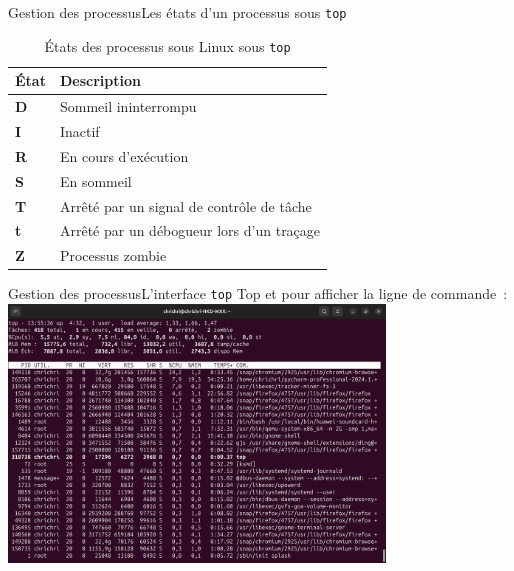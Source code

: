 \documentclass{beamer}
\begin{document}
    \begin{frame}{Gestion des processus}{Les états d'un processus sous \lstinline{top}}
        \begin{table}[h!]
            \centering
            \begin{tabular}{|p{}|p{}|}
                \hline
                \textbf{État} & \textbf{Description}                      \\ \hline
                \textbf{D}    & Sommeil ininterrompu                      \\ \hline
                \textbf{I}    & Inactif                                   \\ \hline
                \textbf{R}    & En cours d'exécution                      \\ \hline
                \textbf{S}    & En sommeil                                \\ \hline
                \textbf{T}    & Arrêté par un signal de contrôle de tâche \\ \hline
                \textbf{t}    & Arrêté par un débogueur lors d'un traçage \\ \hline
                \textbf{Z}    & Processus zombie                          \\ \hline
            \end{tabular}
            \caption{États des processus sous Linux sous \lstinline{top}}
        \end{table}
    \end{frame}

    \begin{frame}{Gestion des processus}{L'interface \lstinline{top}}
        Top et  pour afficher la ligne de commande~:
        \bigbreak
        \centering
        \includegraphics[width=10cm]{image/top-interface}
    \end{frame}
\end{document}
